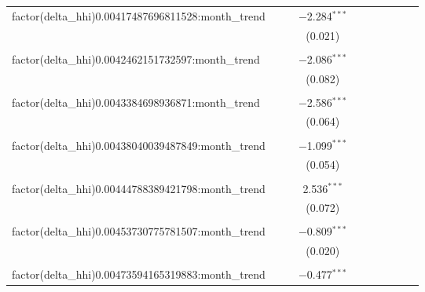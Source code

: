\begin{table}[H]
{\begin{tabular}{@{\extracolsep{5pt}}lccccccccc}
  factor(delta\_hhi)0.00417487696811528:month\_trend &  &  & $-$2.284$^{***}$ &  &  &  &  &  &  \\  

   &  &  & (0.021) &  &  &  &  &  &  \\  

   & & & & & & & & & \\  

  factor(delta\_hhi)0.0042462151732597:month\_trend &  &  & $-$2.086$^{***}$ &  &  &  &  &  &  \\  

   &  &  & (0.082) &  &  &  &  &  &  \\  

   & & & & & & & & & \\  

  factor(delta\_hhi)0.0043384698936871:month\_trend &  &  & $-$2.586$^{***}$ &  &  &  &  &  &  \\  

   &  &  & (0.064) &  &  &  &  &  &  \\  

   & & & & & & & & & \\  

  factor(delta\_hhi)0.00438040039487849:month\_trend &  &  & $-$1.099$^{***}$ &  &  &  &  &  &  \\  

   &  &  & (0.054) &  &  &  &  &  &  \\  

   & & & & & & & & & \\  

  factor(delta\_hhi)0.00444788389421798:month\_trend &  &  & 2.536$^{***}$ &  &  &  &  &  &  \\  

   &  &  & (0.072) &  &  &  &  &  &  \\  

   & & & & & & & & & \\  

  factor(delta\_hhi)0.00453730775781507:month\_trend &  &  & $-$0.809$^{***}$ &  &  &  &  &  &  \\  

   &  &  & (0.020) &  &  &  &  &  &  \\  

   & & & & & & & & & \\  

  factor(delta\_hhi)0.00473594165319883:month\_trend &  &  & $-$0.477$^{***}$ &  &  &  &  &  &  \\  


\end{tabular}}
\end{table}
